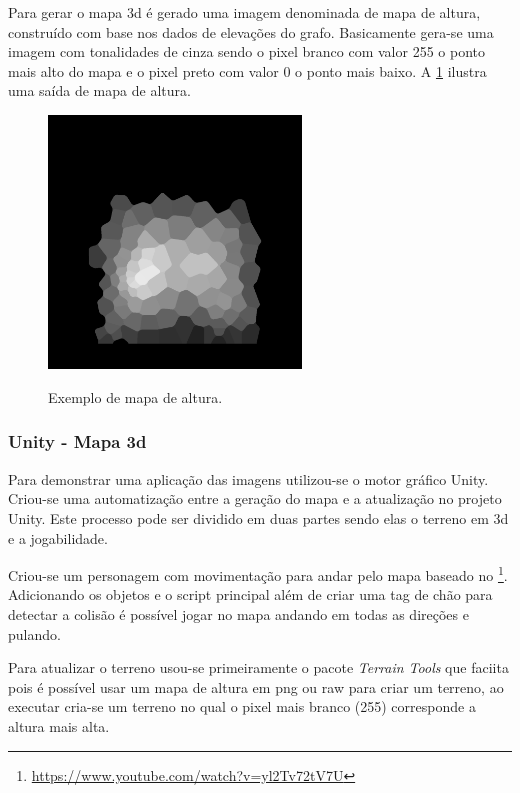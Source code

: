 Para gerar o mapa 3d é gerado uma imagem denominada de mapa de altura, construído com base nos dados de elevações do grafo. Basicamente gera-se uma imagem com tonalidades de cinza sendo o pixel branco com valor 255 o ponto mais alto do mapa e o pixel preto com valor 0 o ponto mais baixo. A \cref{fig:heightmap} ilustra uma saída de mapa de altura.

\begin{figure}[!ht]
	\centering
    \caption{Exemplo de mapa de altura.}
	\includegraphics[width=0.6\textwidth]{figures/heightmap_eample.png}
	\label{fig:heightmap}
\end{figure}

\subsubsection{Unity - Mapa 3d}

Para demonstrar uma aplicação das imagens utilizou-se o motor gráfico Unity. Criou-se uma automatização entre a geração do mapa e a atualização no projeto Unity. Este processo pode ser dividido em duas partes sendo elas o terreno em 3d e a jogabilidade.


Criou-se um personagem com movimentação para andar pelo mapa baseado no \footnote{\url{https://www.youtube.com/watch?v=yl2Tv72tV7U}}. Adicionando os objetos e o script principal além de criar uma tag de chão para detectar a colisão é possível jogar no mapa andando em todas as direções e pulando.

 Para atualizar o terreno usou-se primeiramente o pacote \textit{Terrain Tools} que faciita pois é possível usar um mapa de altura em png ou raw para criar um terreno, ao executar cria-se um terreno no qual o pixel mais branco (255) corresponde a altura mais alta.

